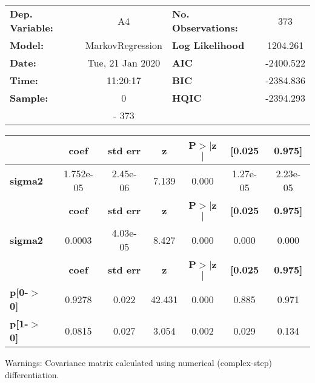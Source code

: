 \begin{center}
\begin{tabular}{lclc}
\toprule
\textbf{Dep. Variable:} &        A4        & \textbf{  No. Observations:  } &    373      \\
\textbf{Model:}         & MarkovRegression & \textbf{  Log Likelihood     } &  1204.261   \\
\textbf{Date:}          & Tue, 21 Jan 2020 & \textbf{  AIC                } & -2400.522   \\
\textbf{Time:}          &     11:20:17     & \textbf{  BIC                } & -2384.836   \\
\textbf{Sample:}        &        0         & \textbf{  HQIC               } & -2394.293   \\
\textbf{}               &       - 373      & \textbf{                     } &             \\
\bottomrule
\end{tabular}
\begin{tabular}{lcccccc}
                & \textbf{coef} & \textbf{std err} & \textbf{z} & \textbf{P$>$$|$z$|$} & \textbf{[0.025} & \textbf{0.975]}  \\
\midrule
\textbf{sigma2} &    1.752e-05  &     2.45e-06     &     7.139  &         0.000        &     1.27e-05    &     2.23e-05     \\
                & \textbf{coef} & \textbf{std err} & \textbf{z} & \textbf{P$>$$|$z$|$} & \textbf{[0.025} & \textbf{0.975]}  \\
\midrule
\textbf{sigma2} &       0.0003  &     4.03e-05     &     8.427  &         0.000        &        0.000    &        0.000     \\
                   & \textbf{coef} & \textbf{std err} & \textbf{z} & \textbf{P$>$$|$z$|$} & \textbf{[0.025} & \textbf{0.975]}  \\
\midrule
\textbf{p[0-$>$0]} &       0.9278  &        0.022     &    42.431  &         0.000        &        0.885    &        0.971     \\
\textbf{p[1-$>$0]} &       0.0815  &        0.027     &     3.054  &         0.002        &        0.029    &        0.134     \\
\bottomrule
\end{tabular}
\end{center}

Warnings: \newline
 [1] Covariance matrix calculated using numerical (complex-step) differentiation.
